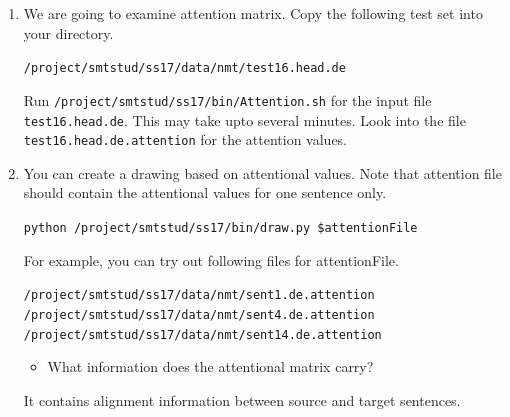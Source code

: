 \documentclass[12pt,fleqn]{article}
\begin{document}
\begin{enumerate} 
 \item We are going to examine attention matrix. Copy the following test set into your directory. 
 
 \texttt{/project/smtstud/ss17/data/nmt/test16.head.de} 
 
 Run \texttt{/project/smtstud/ss17/bin/Attention.sh} for the input file \texttt{test16.head.de}. This may take upto several minutes. Look into the file \texttt{test16.head.de.attention} for the attention values. 
 
 \item You can create a drawing based on attentional values. Note that attention file should contain the attentional values for one sentence only. 
 
 \texttt{python /project/smtstud/ss17/bin/draw.py \$attentionFile} 

 For example, you can try out following files for attentionFile. 
 
 \texttt{/project/smtstud/ss17/data/nmt/sent1.de.attention} \\ 
 \texttt{/project/smtstud/ss17/data/nmt/sent4.de.attention} \\ 
 \texttt{/project/smtstud/ss17/data/nmt/sent14.de.attention} 
 
 \begin{itemize} 
  \item What information does the attentional matrix carry? 
 \end{itemize}

It contains alignment information between source and target sentences. 

 
\end{enumerate}


\end{document}
